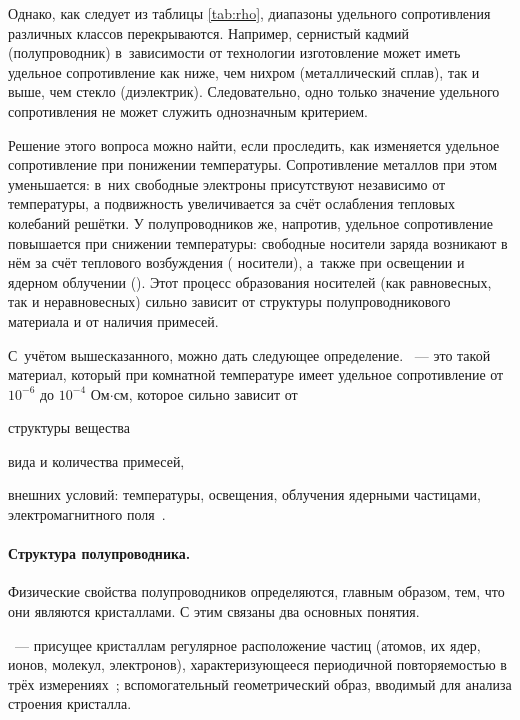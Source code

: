 \documentclass[a4paper, 14pt, titlepage]{extarticle}
\begin{document}
  Однако, как следует из таблицы \ref{tab:rho}, диапазоны удельного сопротивления различных классов
  перекрываются. Например, сернистый кадмий (полупроводник) в~зависимости от технологии изготовление
  может иметь удельное сопротивление как ниже, чем нихром (металлический сплав), так и выше, чем
  стекло (диэлектрик). Следовательно, одно только значение удельного сопротивления не может служить
  однозначным критерием.

  Решение этого вопроса можно найти, если проследить, как изменяется удельное сопротивление при
  понижении температуры. Сопротивление металлов при этом уменьшается: в~них свободные электроны
  присутствуют независимо от температуры, а подвижность увеличивается за счёт ослабления тепловых
  колебаний решётки. У полупроводников же, напротив, удельное сопротивление повышается при снижении
  температуры: свободные носители заряда возникают в нём за счёт теплового возбуждения
  ( носители), а~также при освещении и ядерном облучении ().
  Этот процесс образования носителей (как равновесных, так и неравновесных) сильно зависит от
  структуры полупроводникового материала и от наличия примесей.

  С~учётом вышесказанного, можно дать следующее определение. ~--- это такой
  материал, который при комнатной температуре имеет удельное сопротивление от $10^{-6}$ до $10^{-4}$
  Ом$\cdot$см, которое сильно зависит от
  \begin{enumerate*}[label=\asbuk*)]
    \item структуры вещества
    \item вида и количества примесей,
    \item внешних условий: температуры, освещения, облучения ядерными частицами, электромагнитного
      поля~\cite{shalimova-semiconductors}.
  \end{enumerate*}

  \paragraph{Структура полупроводника.} Физические свойства полупроводников определяются, главным
  образом, тем, что они являются кристаллами. С этим связаны два основных понятия.

  ~--- присущее кристаллам регулярное расположение частиц (атомов, их
  ядер, ионов, молекул, электронов), характеризующееся периодичной повторяемостью в трёх
  измерениях~\cite{physenc-crystall}; вспомогательный геометрический образ, вводимый для анализа
  строения кристалла.
\end{document}
